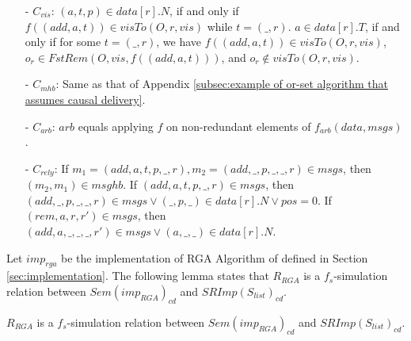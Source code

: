 \begin{itemize}
\item[-] $C_{\mathit{vis}}$: $(a,t,p) \in data[r].N$, if and only if $f((\mathit{add},a,t)) \in \mathit{visTo}(O,r,\mathit{vis})$ while $t = (\_,r)$. $a \in data[r].T$, if and only if for some $t = (\_,r)$, we have $f((\mathit{add},a,t)) \in \mathit{visTo}(O,r,\mathit{vis})$, $o_r \in \mathit{FstRem}(O,\mathit{vis},f((\textit{add},a,t)))$, and $o_r \notin \mathit{visTo}(O,r,\mathit{vis})$.

\item[-] $C_{\mathit{mhb}}$: Same as that of Appendix \ref{subsec:example of or-set algorithm that assumes causal delivery}. 

\item[-] $C_{\mathit{arb}}$: $\mathit{arb}$ equals applying $f$ on non-redundant elements of $f_{\mathit{arb}}(\mathit{data},\mathit{msgs})$. 

\item[-] $C_{\mathit{rely}}$: If $m_1 = (\mathit{add},a,t,p,\_,r), m_2 = (\mathit{add},\_,p,\_,\_,r) \in \mathit{msgs}$, then $(m_2,m_1) \in \mathit{msghb}$. If $(\mathit{add},a,t,p,\_,r) \in \mathit{msgs}$, then $(\mathit{add},\_,p,\_,\_,r) \in \mathit{msgs} \vee (\_,p,\_) \in \mathit{data}[r].N \vee \mathit{pos}=0$. If $(\mathit{rem},a,r,r') \in \mathit{msgs}$, then $(\mathit{add},a,\_,\_,\_,r') \in \mathit{msgs} \vee (a,\_,\_) \in \mathit{data}[r].N$. 
\end{itemize}


Let $\mathit{imp}_{\mathit{rga}}$ be the implementation of RGA Algorithm of \cite{Shapiro:2011} defined in Section \ref{sec:implementation}. The following lemma states that $R_{\mathit{RGA}}$ is a $f_s$-simulation relation between $\mathit{Sem}( \mathit{imp}_{\mathit{RGA}})_{\mathit{cd}}$ and $\mathit{SRImp}(S_{\mathit{list}})_{\mathit{cd}}$. %

\begin{lemma}
\label{lemma:Rrga is a fs simulation between RGA causal delivery algorithm and list specification}
$R_{\mathit{RGA}}$ is a $f_s$-simulation relation between $\mathit{Sem}( \mathit{imp}_{\mathit{RGA}})_{\mathit{cd}}$ and $\mathit{SRImp}(S_{\mathit{list}})_{\mathit{cd}}$.
\end{lemma}

